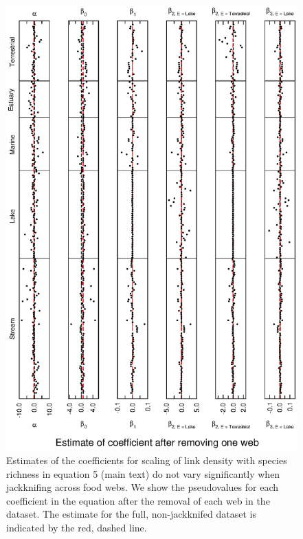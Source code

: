 \documentclass[12pt]{article}
\begin{document}
    \begin{figure}[!h]
    \centerline{\includegraphics*[height=.75\textheight]{Figures/Jackknife/LS_web.eps}}
    \caption{Estimates of the coefficients for scaling of link density with species richness
    in equation 5 (main text) do not vary significantly when jackknifing across food webs. 
    We show the pseudovalues for each coefficient in the equation after the removal of each 
    web in the dataset. The estimate for the full, non-jackknifed dataset is indicated by 
    the red, dashed line.}
    \label{LS_web}
    \end{figure}

\newpage
\end{document}
